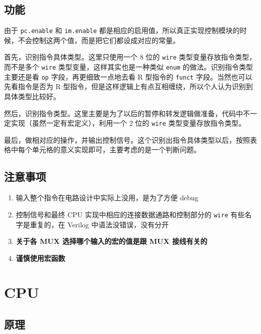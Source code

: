 \documentclass[12pt,AutoFakeBold]{article}
\providecommand{\tightlist}{%
  \setlength{\itemsep}{0pt}\setlength{\parskip}{0pt}}
\begin{document}
\hypertarget{ux529fux80fd-13}{%
\subsection{功能}\label{ux529fux80fd-13}}

由于 \texttt{pc.enable} 和 \texttt{im.enable}
都是相应的启用值，所以真正实现控制模块的时候，不会控制这两个值，而是把它们都设成对应的常量。

首先，识别指令具体类型。这里只使用一个 8 位的 \texttt{wire}
类型变量存放指令类型，而不是多个 \texttt{wire}
类型变量，这样其实也是一种类似 \texttt{enum}
的做法。识别指令类型主要还是看 \texttt{op} 字段，再更细致一点地去看 R
型指令的 \texttt{funct} 字段。当然也可以先看指令是否为 R
型指令，但是这样逻辑上有点互相缠绕，所以个人认为识别到具体类型比较好。

然后，识别指令类型。这里主要是为了以后的暂停和转发逻辑做准备，代码中不一定实现（虽然一定有宏定义），利用一个
2 位的 \texttt{wire} 类型变量存放指令类型。

最后，做相对应的操作，并输出控制信号。这个识别出指令具体类型以后，按照表格中每个单元格的意义实现即可，主要考虑的是一个判断问题。

\hypertarget{ux6ce8ux610fux4e8bux9879-7}{%
\subsection{注意事项}\label{ux6ce8ux610fux4e8bux9879-7}}

\begin{enumerate}
\def\labelenumi{\arabic{enumi}.}
\tightlist
\item
  输入整个指令在电路设计中实际上没用，是为了方便 debug
\item
  控制信号和最终 CPU 实现中相应的连接数据通路和控制部分的 \texttt{wire}
  有些名字是重复的，在 Verilog 中语法没错误，没有分开
\item
  \textbf{关于各 MUX 选择哪个输入的宏的值是跟 MUX 接线有关的}
\item
  \textbf{谨慎使用宏函数}
\end{enumerate}

\hypertarget{cpu}{%
\section{CPU}\label{cpu}}

\hypertarget{ux539fux7406-5}{%
\subsection{原理}\label{ux539fux7406-5}}
\end{document}
